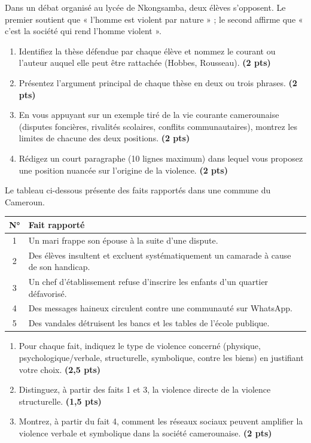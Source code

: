 \documentclass[11pt]{article}
\begin{document}
\begin{exercice}
Dans un débat organisé au lycée de Nkongsamba, deux élèves s'opposent. Le premier soutient que « l'homme est violent par nature » ; le second affirme que « c'est la société qui rend l'homme violent ».
\begin{enumerate}
\item Identifiez la thèse défendue par chaque élève et nommez le courant ou l'auteur auquel elle peut être rattachée (Hobbes, Rousseau). \textbf{(2 pts)}
\item Présentez l'argument principal de chaque thèse en deux ou trois phrases. \textbf{(2 pts)}
\item En vous appuyant sur un exemple tiré de la vie courante camerounaise (disputes foncières, rivalités scolaires, conflits communautaires), montrez les limites de chacune des deux positions. \textbf{(2 pts)}
\item Rédigez un court paragraphe (10 lignes maximum) dans lequel vous proposez une position nuancée sur l'origine de la violence. \textbf{(2 pts)}
\end{enumerate}
\end{exercice}

\begin{exercice}
Le tableau ci-dessous présente des faits rapportés dans une commune du Cameroun.

\begin{center}
\begin{tabular}{|c|p{9cm}|}
\hline
\textbf{N°} & \textbf{Fait rapporté} \\
\hline
1 & Un mari frappe son épouse à la suite d'une dispute. \\
\hline
2 & Des élèves insultent et excluent systématiquement un camarade à cause de son handicap. \\
\hline
3 & Un chef d'établissement refuse d'inscrire les enfants d'un quartier défavorisé. \\
\hline
4 & Des messages haineux circulent contre une communauté sur WhatsApp. \\
\hline
5 & Des vandales détruisent les bancs et les tables de l'école publique. \\
\hline
\end{tabular}
\end{center}

\begin{enumerate}
\item Pour chaque fait, indiquez le type de violence concerné (physique, psychologique/verbale, structurelle, symbolique, contre les biens) en justifiant votre choix. \textbf{(2,5 pts)}
\item Distinguez, à partir des faits 1 et 3, la violence directe de la violence structurelle. \textbf{(1,5 pts)}
\item Montrez, à partir du fait 4, comment les réseaux sociaux peuvent amplifier la violence verbale et symbolique dans la société camerounaise. \textbf{(2 pts)}
\end{enumerate}
\end{exercice}
\end{document}
